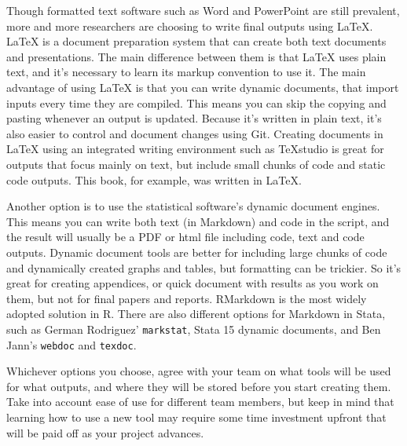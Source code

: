 Though formatted text software such as Word and PowerPoint are still prevalent,
more and more researchers are choosing to write final outputs using
\LaTeX.
{\LaTeX} is a document preparation system that can create both text documents and presentations.
The main difference between them is that {\LaTeX} uses plain text,
and it's necessary to learn its markup convention to use it.
The main advantage of using {\LaTeX} is that you can write dynamic documents,
that import inputs every time they are compiled.
This means you can skip the copying and pasting whenever an output is updated.
Because it's written in plain text, it's also easier to control and document changes using Git.
Creating documents in {\LaTeX} using an integrated writing environment such as TeXstudio
is great for outputs that focus mainly on text,
but include small chunks of code and static code outputs.
This book, for example, was written in \LaTeX.

Another option is to use the statistical software's dynamic document engines.
This means you can write both text (in Markdown) and code in the script,
and the result will usually be a PDF or html file including code,
text and code outputs.
Dynamic document tools are better for including large chunks of code and dynamically created graphs and tables,
but formatting can be trickier.
So it's great for creating appendices,
or quick document with results as you work on them,
but not for final papers and reports.
RMarkdown is the most widely adopted solution in R.
There are also different options for Markdown in Stata,
such as German Rodriguez' \texttt{markstat},
Stata 15 dynamic documents,
and Ben Jann's \texttt{webdoc} and
\texttt{texdoc}.

Whichever options you choose,
agree with your team on what tools will be used for what outputs, and
where they will be stored before you start creating them.
Take into account ease of use for different team members, but
keep in mind that learning how to use a new tool may require some
time investment upfront that will be paid off as your project advances.

